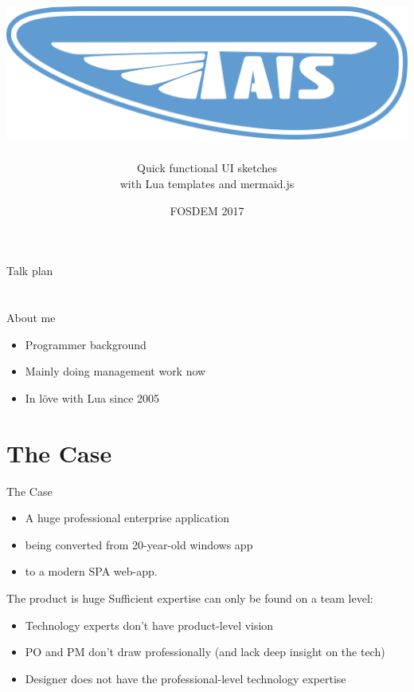 \documentclass[aspectratio=43,handout,bigger]{beamer}
\title{\includegraphics[height=.15\textheight]{logo}}
\author{Quick functional UI sketches\\with Lua templates and mermaid.js}
\institute{Alexander Gladysh\\@agladysh}
\date{FOSDEM 2017}
\begin{document}
\begin{frame}[plain]
 \titlepage
\end{frame}


\begin{frame}{Talk plan}

\tableofcontents

\end{frame}


\section*{}

\begin{frame}{About me}

\begin{itemize}
\item Programmer background
\item Mainly doing management work now
\item In löve with Lua since 2005
\end{itemize}

\end{frame}

\section{The Case}

\begin{frame}{The Case}
  \begin{itemize}
    \item A huge professional enterprise application
    \item being converted from 20-year-old windows app
    \item to a modern SPA web-app.
  \end{itemize}
\end{frame}


\begin{frame}{The product is huge}
  Sufficient expertise can only be found on a team level:

  \begin{itemize}
    \item Technology experts don't have product-level vision
    \item PO and PM don't draw professionally
          (and lack deep insight on the tech)
    \item Designer does not have the professional-level technology expertise
  \end{itemize}
\end{frame}
\end{document}
